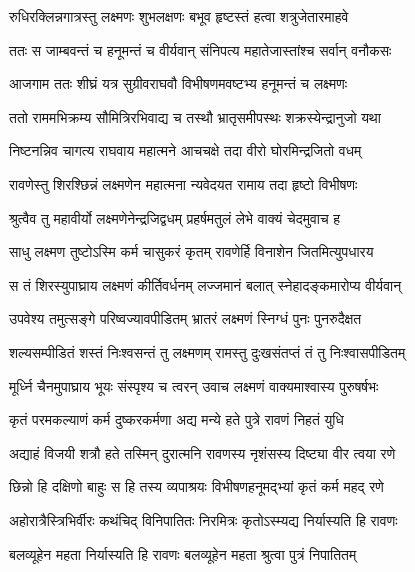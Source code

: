 
\twolineshloka
{रुधिरक्लिन्नगात्रस्तु लक्ष्मणः शुभलक्षणः}
{बभूव हृष्टस्तं हत्वा शत्रुजेतारमाहवे} %

\twolineshloka
{ततः स जाम्बवन्तं च हनूमन्तं च वीर्यवान्}
{संनिपत्य महातेजास्तांश्च सर्वान् वनौकसः} %

\twolineshloka
{आजगाम ततः शीघ्रं यत्र सुग्रीवराघवौ}
{विभीषणमवष्टभ्य हनूमन्तं च लक्ष्मणः} %

\twolineshloka
{ततो राममभिक्रम्य सौमित्रिरभिवाद्य च}
{तस्थौ भ्रातृसमीपस्थः शक्रस्येन्द्रानुजो यथा} %

\twolineshloka
{निष्टनन्निव चागत्य राघवाय महात्मने}
{आचचक्षे तदा वीरो घोरमिन्द्रजितो वधम्} %

\twolineshloka
{रावणेस्तु शिरश्छिन्नं लक्ष्मणेन महात्मना}
{न्यवेदयत रामाय तदा हृष्टो विभीषणः} %

\twolineshloka
{श्रुत्वैव तु महावीर्यो लक्ष्मणेनेन्द्रजिद्वधम्}
{प्रहर्षमतुलं लेभे वाक्यं चेदमुवाच ह} %

\twolineshloka
{साधु लक्ष्मण तुष्टोऽस्मि कर्म चासुकरं कृतम्}
{रावणेर्हि विनाशेन जितमित्युपधारय} %

\twolineshloka
{स तं शिरस्युपाघ्राय लक्ष्मणं कीर्तिवर्धनम्}
{लज्जमानं बलात् स्नेहादङ्कमारोप्य वीर्यवान्} %

\twolineshloka
{उपवेश्य तमुत्सङ्गे परिष्वज्यावपीडितम्}
{भ्रातरं लक्ष्मणं स्निग्धं पुनः पुनरुदैक्षत} %

\twolineshloka
{शल्यसम्पीडितं शस्तं निःश्वसन्तं तु लक्ष्मणम्}
{रामस्तु दुःखसंतप्तं तं तु निःश्वासपीडितम्} %

\twolineshloka
{मूर्ध्नि चैनमुपाघ्राय भूयः संस्पृश्य च त्वरन्}
{उवाच लक्ष्मणं वाक्यमाश्वास्य पुरुषर्षभः} %

\twolineshloka
{कृतं परमकल्याणं कर्म दुष्करकर्मणा}
{अद्य मन्ये हते पुत्रे रावणं निहतं युधि} %

\twolineshloka
{अद्याहं विजयी शत्रौ हते तस्मिन् दुरात्मनि}
{रावणस्य नृशंसस्य दिष्ट्या वीर त्वया रणे} %

\twolineshloka
{छिन्नो हि दक्षिणो बाहुः स हि तस्य व्यपाश्रयः}
{विभीषणहनूमद्भ्यां कृतं कर्म महद् रणे} %

\twolineshloka
{अहोरात्रैस्त्रिभिर्वीरः कथंचिद् विनिपातितः}
{निरमित्रः कृतोऽस्म्यद्य निर्यास्यति हि रावणः} %

\twolineshloka
{बलव्यूहेन महता निर्यास्यति हि रावणः}
{बलव्यूहेन महता श्रुत्वा पुत्रं निपातितम्} %

